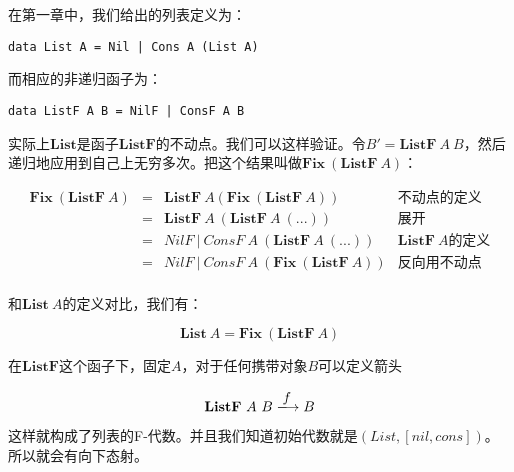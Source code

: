 \documentclass{article}
\begin{document}
\begin{example}
在第一章中，我们给出的列表定义为：

\lstset{frame=none}
\begin{lstlisting}
data List A = Nil | Cons A (List A)
\end{lstlisting}

而相应的非递归函子为：

\begin{lstlisting}
data ListF A B = NilF | ConsF A B
\end{lstlisting}

实际上$\mathbf{List}$是函子$\mathbf{ListF}$的不动点。我们可以这样验证。令$B' = \mathbf{ListF}\ A\ B$，然后递归地应用到自己上无穷多次。把这个结果叫做$\mathbf{Fix}\ (\mathbf{ListF}\ A)$：

\[
\begin{array}{rcll}
\mathbf{Fix}\ (\mathbf{ListF}\ A)
& = & \mathbf{ListF}\ A (\mathbf{Fix}\ (\mathbf{ListF}\ A)) & \text{不动点的定义} \\
& = & \mathbf{ListF}\ A\ (\mathbf{ListF}\ A\ (...)) & \text{展开} \\
& = & NilF\ |\ ConsF\ A\ (\mathbf{ListF}\ A\ (...)) & \mathbf{ListF}\ A \text{的定义} \\
& = & NilF\ |\ ConsF\ A\ (\mathbf{Fix}\ (\mathbf{ListF}\ A)) & \text{反向用不动点} \\
\end{array}
\]

和$\mathbf{List}\ A$的定义对比，我们有：

\[
\mathbf{List}\ A = \mathbf{Fix}\ (\mathbf{ListF}\ A)
\]

在$\mathbf{ListF}$这个函子下，固定$A$，对于任何携带对象$B$可以定义箭头

\[
\mathbf{ListF}\ A\ B \arrowto{f} B
\]

这样就构成了列表的F-代数。并且我们知道初始代数就是$(List, [nil, cons])$。所以就会有向下态射。

\begin{center}
\end{center}


\end{example}
\end{document}

